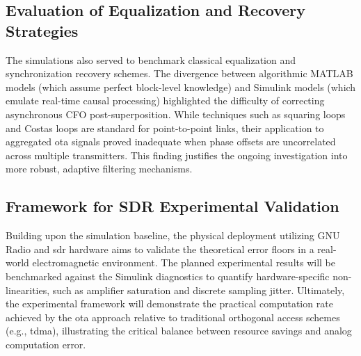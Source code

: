 \documentclass[Markos_Delaportas_1316.tex]{subfiles}
\begin{document}
\subsection{Evaluation of Equalization and Recovery Strategies}
The simulations also served to benchmark classical equalization and
synchronization recovery
schemes. The divergence between algorithmic MATLAB models (which
    assume perfect block-level
knowledge) and Simulink models (which emulate real-time causal
processing) highlighted the
difficulty of correcting asynchronous CFO post-superposition. While
techniques such as
squaring loops and Costas loops are standard for point-to-point
links, their application to
aggregated \gls{ota} signals proved inadequate when phase offsets are
uncorrelated across
multiple transmitters. This finding justifies the ongoing
investigation into more robust,
adaptive filtering mechanisms.

\subsection{Framework for SDR Experimental Validation}
Building upon the simulation baseline, the physical deployment
utilizing GNU Radio and \gls{sdr}
hardware aims to validate the theoretical error floors in a
real-world electromagnetic environment.
The planned experimental results will be benchmarked against the
Simulink diagnostics to quantify
hardware-specific non-linearities, such as amplifier saturation and
discrete sampling jitter.
Ultimately, the experimental framework will demonstrate the practical
computation rate achieved
by the \gls{ota} approach relative to traditional orthogonal access
schemes (e.g., \gls{tdma}),
illustrating the critical balance between resource savings and analog
computation error.

\ifSubfilesClassLoaded{
    \clearpage
    \printbibliography
}{}
\end{document}
